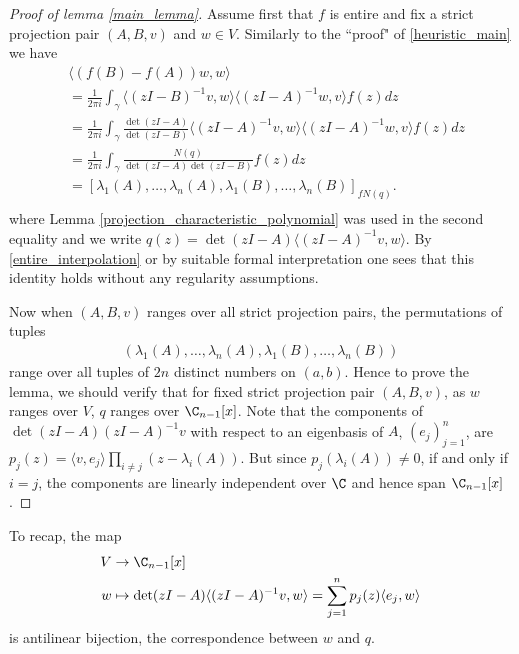 \begin{proof}[Proof of lemma \ref{main_lemma}]
	Assume first that $f$ is entire and fix a strict projection pair $(A, B, v)$ and $w \in V$. Similarly to the ``proof" of \ref{heuristic_main} we have
	\begin{align*}
		&\langle (f(B) - f(A)) w, w \rangle \\
		&= \frac{1}{2 \pi i}\int_{\gamma} \langle (z I - B)^{-1} v, w \rangle  \langle (z I - A)^{-1} w, v \rangle f(z) dz \\
		&= \frac{1}{2 \pi i}\int_{\gamma} \frac{\det(z I - A)}{\det(z I - B)}\langle (z I - A)^{-1} v, w \rangle  \langle (z I - A)^{-1} w, v \rangle f(z) dz \\
		&= \frac{1}{2 \pi i}\int_{\gamma} \frac{N(q)}{\det(z I - A) \det(z I - B)} f(z) dz \\
		&= [\lambda_{1}(A), \ldots, \lambda_{n}(A), \lambda_{1}(B), \ldots, \lambda_{n}(B)]_{f N(q)}. \\
	\end{align*}
	where Lemma \ref{projection_characteristic_polynomial} was used in the second equality and we write $q(z) = \det(z I - A) \langle (z I - A)^{-1} v, w \rangle$. By \ref{entire_interpolation} or by suitable formal interpretation one sees that this identity holds without any regularity assumptions.

	Now when $(A, B, v)$ ranges over all strict projection pairs, the permutations of tuples
	\begin{align}
	(\lambda_{1}(A), \ldots, \lambda_{n}(A), \lambda_{1}(B), \ldots, \lambda_{n}(B))
	\end{align}
	range over all tuples of $2 n$ distinct numbers on $(a, b)$. Hence to prove the lemma, we should verify that for fixed strict projection pair $(A, B, v)$, as $w$ ranges over $V$, $q$ ranges over $\C_{n - 1}[x]$. Note that the components of $\det(z I - A)(z I - A)^{-1} v$ with respect to an eigenbasis of $A$, $(e_{j})_{j = 1}^{n}$, are $p_{j}(z) =  \langle v, e_{j} \rangle \prod_{i \neq j}(z - \lambda_{i}(A))$. But since $p_{j}(\lambda_{i}(A)) \neq 0$, if and only if $i = j$, the components are linearly independent over $\C$ and hence span $\C_{n - 1}[x]$.
\end{proof}

	To recap, the map
	\begin{align*}
		V &\to \C_{n - 1}[x] \\
		w &\mapsto \det(z I - A) \langle (z I - A)^{-1} v, w \rangle = \sum_{j = 1}^{n} p_{j}(z) \langle e_{j}, w \rangle
	\end{align*}
	is antilinear bijection, the correspondence between $w$ and $q$.

